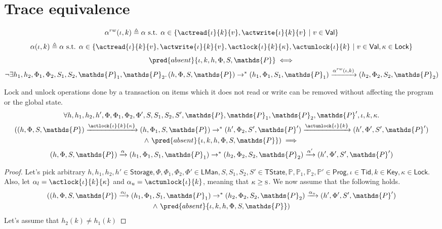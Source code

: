 \section{Trace equivalence}

\[
	\alpha^{rw}(\iota, k) \triangleq \alpha \text{ s.t. }
	\alpha \in 
		\{
			\actread{\iota}{k}{v},
			\actwrite{\iota}{k}{v}\
			|\ v \in \mathsf{Val}
		\}
\]
\[
	\alpha(\iota, k) \triangleq \alpha \text{ s.t. }
	\alpha \in 
		\{
			\actread{\iota}{k}{v},
			\actwrite{\iota}{k}{v},
			\actlock{\iota}{k}{\kappa},
			\actunlock{\iota}{k}\
			|\ v \in \mathsf{Val}, \kappa \in \mathsf{Lock}
		\}
\]
\begin{gather*}
	\pred{absent}{\iota, k,  h, \Phi, S, \mathds{P}}
		\iff \\
	\lnot \exists h_1, h_2, \Phi_1, \Phi_2, S_1, S_2, \mathds{P}_1, \mathds{P}_2 \ldotp (h, \Phi, S, \mathds{P}) \rightarrow^* (h_1, \Phi_1, S_1, \mathds{P}_1) \xrightarrow{\alpha^{rw}(\iota, k)} (h_2, \Phi_2, S_2, \mathds{P}_2)
\end{gather*}

\lem Lock and unlock operations done by a transaction on items which it does not read or write can be removed without affecting the program or the global state.
\begin{gather*}
	\forall h, h_1, h_2, h', \Phi, \Phi_1, \Phi_2, \Phi', S, S_1, S_2, S', \mathds{P}, \mathds{P}_1, \mathds{P}_2, \mathds{P}', \iota, k, \kappa \ldotp \\
	((h, \Phi, S, \mathds{P}) \xrightarrow{\actlock{\iota}{k}{\kappa}} (h, \Phi_1, S, \mathds{P}) \rightarrow^* (h', \Phi_2, S', \mathds{P}') \xrightarrow{\actunlock{\iota}{k}} (h', \Phi', S', \mathds{P}') \\
	\land\ \pred{absent}{\iota, k, h, \Phi, S, \mathds{P}})
		\implies \\
	(h, \Phi, S, \mathds{P}) \xrightarrow{\alpha} (h_1, \Phi_1, S_1, \mathds{P}_1) \rightarrow^* (h_2, \Phi_2, S_2, \mathds{P}_2) \xrightarrow{\alpha'} (h', \Phi', S', \mathds{P}')
\end{gather*}
\begin{proof}
Let's pick arbitrary $h, h_1, h_2, h' \in \mathsf{Storage}, \Phi, \Phi_1, \Phi_2, \Phi' \in \mathsf{LMan}, S, S_1, S_2, S' \in \mathsf{TState}, \mathds{P}, \mathds{P}_1, \mathds{P}_2, \mathds{P}' \in \mathsf{Prog}, \iota \in \mathsf{Tid}, k \in \mathsf{Key}, \kappa \in \mathsf{Lock}$. Also, let $\alpha_l = \actlock{\iota}{k}{\kappa}$ and $\alpha_u = \actunlock{\iota}{k}$, meaning that $\kappa \geq \textsc{s}$. We now assume that the following holds.
\begin{gather*}
	((h, \Phi, S, \mathds{P}) \xrightarrow{\alpha_l} (h_1, \Phi_1, S_1, \mathds{P}_1) \rightarrow^* (h_2, \Phi_2, S_2, \mathds{P}_2) \xrightarrow{\alpha_u} (h', \Phi', S', \mathds{P}') \\
	\land\ \pred{absent}{\iota, k, h, \Phi, S, \mathds{P}})
\end{gather*}
Let's assume that $h_2(k) \neq h_1(k)$

\end{proof}

